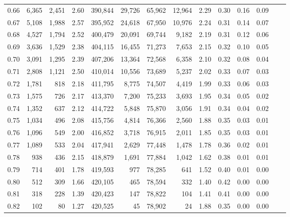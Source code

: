 \begin{tabular}{rrrrrrrrrrrrrr}
0.66 &   6,365 &  2,451 &    2.60 &  390,844 &   29,726 &  65,962 &  12,964 &  2.29 &  0.30 &  0.16 &      0.09 \\
0.67 &   5,108 &  1,988 &    2.57 &  395,952 &   24,618 &  67,950 &  10,976 &  2.24 &  0.31 &  0.14 &      0.07 \\
0.68 &   4,527 &  1,794 &    2.52 &  400,479 &   20,091 &  69,744 &   9,182 &  2.19 &  0.31 &  0.12 &      0.06 \\
0.69 &   3,636 &  1,529 &    2.38 &  404,115 &   16,455 &  71,273 &   7,653 &  2.15 &  0.32 &  0.10 &      0.05 \\
0.70 &   3,091 &  1,295 &    2.39 &  407,206 &   13,364 &  72,568 &   6,358 &  2.10 &  0.32 &  0.08 &      0.04 \\
0.71 &   2,808 &  1,121 &    2.50 &  410,014 &   10,556 &  73,689 &   5,237 &  2.02 &  0.33 &  0.07 &      0.03 \\
0.72 &   1,781 &    818 &    2.18 &  411,795 &    8,775 &  74,507 &   4,419 &  1.99 &  0.33 &  0.06 &      0.03 \\
0.73 &   1,575 &    726 &    2.17 &  413,370 &    7,200 &  75,233 &   3,693 &  1.95 &  0.34 &  0.05 &      0.02 \\
0.74 &   1,352 &    637 &    2.12 &  414,722 &    5,848 &  75,870 &   3,056 &  1.91 &  0.34 &  0.04 &      0.02 \\
0.75 &   1,034 &    496 &    2.08 &  415,756 &    4,814 &  76,366 &   2,560 &  1.88 &  0.35 &  0.03 &      0.01 \\
0.76 &   1,096 &    549 &    2.00 &  416,852 &    3,718 &  76,915 &   2,011 &  1.85 &  0.35 &  0.03 &      0.01 \\
0.77 &   1,089 &    533 &    2.04 &  417,941 &    2,629 &  77,448 &   1,478 &  1.78 &  0.36 &  0.02 &      0.01 \\
0.78 &     938 &    436 &    2.15 &  418,879 &    1,691 &  77,884 &   1,042 &  1.62 &  0.38 &  0.01 &      0.01 \\
0.79 &     714 &    401 &    1.78 &  419,593 &      977 &  78,285 &     641 &  1.52 &  0.40 &  0.01 &      0.00 \\
0.80 &     512 &    309 &    1.66 &  420,105 &      465 &  78,594 &     332 &  1.40 &  0.42 &  0.00 &      0.00 \\
0.81 &     318 &    228 &    1.39 &  420,423 &      147 &  78,822 &     104 &  1.41 &  0.41 &  0.00 &      0.00 \\
0.82 &     102 &     80 &    1.27 &  420,525 &       45 &  78,902 &      24 &  1.88 &  0.35 &  0.00 &      0.00 \\

\end{tabular}
